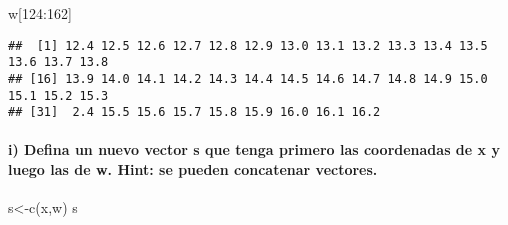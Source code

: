 \documentclass[
]{article}
\newenvironment{Shaded}{\begin{snugshade}}{\end{snugshade}}
\newcommand{\DecValTok}[1]{\textcolor[rgb]{0.00,0.00,0.81}{#1}}
\newcommand{\FunctionTok}[1]{\textcolor[rgb]{0.00,0.00,0.00}{#1}}
\newcommand{\NormalTok}[1]{#1}
\newcommand{\OtherTok}[1]{\textcolor[rgb]{0.56,0.35,0.01}{#1}}
\newcommand{\SpecialCharTok}[1]{\textcolor[rgb]{0.00,0.00,0.00}{#1}}
\begin{document}
\begin{Shaded}
\begin{Highlighting}[]
\NormalTok{w[}\DecValTok{124}\SpecialCharTok{:}\DecValTok{162}\NormalTok{]}
\end{Highlighting}
\end{Shaded}

\begin{verbatim}
##  [1] 12.4 12.5 12.6 12.7 12.8 12.9 13.0 13.1 13.2 13.3 13.4 13.5 13.6 13.7 13.8
## [16] 13.9 14.0 14.1 14.2 14.3 14.4 14.5 14.6 14.7 14.8 14.9 15.0 15.1 15.2 15.3
## [31]  2.4 15.5 15.6 15.7 15.8 15.9 16.0 16.1 16.2
\end{verbatim}

\hypertarget{i-defina-un-nuevo-vector-s-que-tenga-primero-las-coordenadas-de-x-y-luego-las-de-w.-hint-se-pueden-concatenar-vectores.}{%
\paragraph{i) Defina un nuevo vector s que tenga primero las coordenadas
de x y luego las de w. Hint: se pueden concatenar
vectores.}\label{i-defina-un-nuevo-vector-s-que-tenga-primero-las-coordenadas-de-x-y-luego-las-de-w.-hint-se-pueden-concatenar-vectores.}}

\begin{Shaded}
\begin{Highlighting}[]
\NormalTok{s}\OtherTok{\textless{}{-}}\FunctionTok{c}\NormalTok{(x,w)}
\NormalTok{s}
\end{Highlighting}
\end{Shaded}
\end{document}
